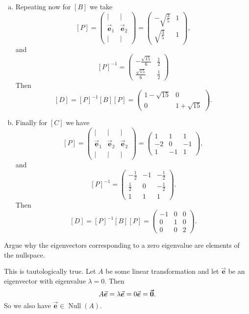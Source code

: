 \documentclass[12pt]{article} %
\newcommand{\Null}{\operatorname{Null}}
\newcommand{\evec}{\vec{\boldsymbol{e}}}
\begin{document}
\begin{solution}
\begin{enumerate}[(a)]
    \item Repeating now for $[B]$ we take
    \[
    [P] = \begin{pmatrix} \vert & \vert \\ \evec_1 & \evec_2 \\ \vert & \vert\end{pmatrix} = \begin{pmatrix} -\sqrt{\frac{3}{5}} & 1 \\ \sqrt{\frac{3}{5}} & 1 \end{pmatrix},
    \]
    and
    \[
    [P]^{-1} = \begin{pmatrix} -\frac{\sqrt{15}}{6} & \frac{1}{2} \\ \frac{\sqrt{15}}{6} & \frac{1}{2} \end{pmatrix}
    \]
    Then
    \[
    [D] = [P]^{-1} [B] [P] = \begin{pmatrix} 1-\sqrt{15} & 0 \\ 0 & 1+\sqrt{15} \end{pmatrix}.
    \]

    \item Finally for $[C]$ we have
    \[
    [P] = \begin{pmatrix} \vert & \vert & \vert \\ \evec_1 & \evec_2 & \evec_2 \\ \vert & \vert & \vert \end{pmatrix} = \begin{pmatrix} 1 & 1 & 1 \\ -2 & 0 & -1 \\ 1 & -1 & 1 \end{pmatrix},
    \]
    and
    \[
    [P]^{-1} = \begin{pmatrix} -\frac{1}{2} & -1 & - \frac{1}{2} \\ \frac{1}{2} & 0 & -\frac{1}{2} \\ 1 & 1 & 1 \end{pmatrix}.
    \]
    Then
    \[
    [D] = [P]^{-1} [B] [P] = \begin{pmatrix} -1 & 0 & 0 \\ 0 & 1 & 0 \\ 0 & 0 & 2 \end{pmatrix}.
    \]
\end{enumerate}
\end{solution}

\newpage
\begin{problem}
Argue why the eigenvectors corresponding to a zero eigenvalue are elements of the nullspace.
\end{problem}
\begin{solution}
This is tautologically true.  Let $A$ be some linear transformation and let $\evec$ be an eigenvector with eigenvalue $\lambda=0$.  Then
\[
A\evec = \lambda \evec = 0\evec = \zerovec.
\]
So we also have $\evec \in \Null(A)$.
\end{solution}
\end{document}
